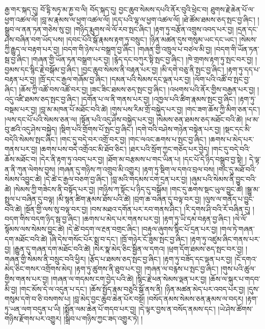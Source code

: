 \setcounter{footnote}{0} 
རྒྱ་གར་སྐད་དུ། བོ་དྷི་སཏྭ་མ་ཎྱ་བ་ལི། བོད་སྐད་དུ། བྱང་ཆུབ་སེམས་དཔའི་ནོར་བུའི་ཕྲེང་བ། ཐུགས་རྗེ་ཆེན་པོ་ལ་ཕྱག་འཚལ་ལོ། །བླ་མ་རྣམས་ལ་ཕྱག་འཚལ་ལོ། །དད་པའི་ལྷ་ལ་ཕྱག་འཚལ་ལོ། །ཐེ་ཚོམ་ཐམས་ཅད་སྤང་བྱ་ཞིང་། །སྒྲུབ་ལ་ནན་ཏན་གཅེས་སུ་བྱ། །གཉིད་རྨུགས་ལེ་ལོ་རབ་སྤང་ཞིང་། །རྟག་ཏུ་བརྩོན་འགྲུས་འབད་པར་བྱ། །དྲན་དང་ཤེས་བཞིན་བག་ཡོད་པས། །དབང་པོའི་སྒོ་རྣམས་རྟག་ཏུ་བསྲུང་། །ཉིན་མཚན་དུས་གསུམ་ཡང་དང་ཡང་། །སེམས་ཀྱི་རྒྱུད་ལ་བརྟག་པར་བྱ། །བདག་གི་ཉེས་པ་བསྒྲག་བྱ་ཞིང་། །གཞན་གྱི་འཁྲུལ་པ་བཙལ་མི་བྱ། །བདག་གི་ཡོན་ཏན་སྦ་བྱ་ཞིང་། །གཞན་གྱི་ཡོན་ཏན་བསྒྲག་པར་བྱ། །རྙེད་དང་བཀུར་སྟི་སྤང་བྱ་ཞིང་། །ཁེ་གྲགས་རྟག་ཏུ་སྤང་བར་བྱ། །བྱམས་དང་སྙིང་རྗེ་བསྒོམ་བྱ་ཞིང་། །བྱང་ཆུབ་སེམས་ནི་བརྟན་པར་བྱ། །མི་དགེ་བཅུ་ནི་སྤང་བྱ་ཞིང་། །རྟག་ཏུ་དད་པ་བརྟན་པར་བྱ། །ཁྲོ་དང་ང་རྒྱལ་གཞོམ་བྱ་ཞིང་། །དམན་པའི་སེམས་དང་ལྡན་པར་བྱ། །ལོག་པའི་འཚོ་བ་སྤང་བྱ་ཞིང་། །ཆོས་ཀྱི་འཚོ་བས་འཚོ་བར་བྱ། །ཟང་ཟིང་ཐམས་ཅད་སྤང་བྱ་ཞིང་། །འཕགས་པའི་ནོར་གྱིས་བརྒྱན་པར་བྱ། །འདུ་འཛི་ཐམས་ཅད་སྤང་བྱ་ཞིང་། །དགོན་པ་ལ་ནི་གནས་པར་བྱ། །འཁྱལ་པའི་ཚིག་རྣམས་སྤང་བྱ་ཞིང་། །རྟག་ཏུ་བསྡམ་པར་བྱ། །བླ་མ་མཁན་པོ་མཐོང་བའི་ཚེ། །གུས་པས་རིམ་གྲོ་བསྐྱེད་པར་བྱ། །གང་ཟག་ཆོས་ཀྱི་མིག་ཅན་དང་། །ལས་དང་པོ་པའི་སེམས་ཅན་ལ། །སྟོན་པའི་འདུ་ཤེས་བསྐྱེད་པར་བྱ། །སེམས་ཅན་ཐམས་ཅད་མཐོང་བའི་ཚེ། །ཕ་མ་བུ་ཚའི་འདུ་ཤེས་བསྐྱེད། །སྡིག་པའི་གྲོགས་པོ་སྤང་བྱ་ཞིང་། །དགེ་བའི་བཤེས་གཉེན་བསྟེན་པར་བྱ། །སྡང་དང་མི་བདེའི་སེམས་སྤང་ཞིང་། །གང་དུ་བདེ་བར་འགྲོ་བར་བྱ། །གང་ལའང་ཆགས་པ་སྤང་བྱ་ཞིང་། །ཆགས་པ་མེད་པར་གནས་པར་བྱ། །ཆགས་པས་བདེ་འགྲོའང་མི་ཐོབ་ཅིང་། །ཐར་པའི་སྲོག་ཀྱང་གཅོད་པར་བྱེད། །གང་དུ་བདེ་བའི་ཆོས་མཐོང་བ། །དེར་ནི་རྟག་ཏུ་འབད་པར་བྱ། །ཐོག་མ་བརྩམས་པ་གང་ཡིན་པ། །དང་པོ་དེ་ཉིད་བསྒྲུབ་བྱ་སྟེ། །
དེ་ལྟ་ན་ནི་ཀུན་ལེགས་བྱས། །གཞན་དུ་གཉིས་ཀ་འགྲུབ་མི་འགྱུར། །རྟག་ཏུ་སྡིག་ལ་དགའ་བྲལ་བས། །གང་དུ་མཐོ་བའི་སེམས་འབྱུང་ཚེ། །དེ་ཚེ་ང་རྒྱལ་བཅག་བྱ་ཞིང་། །བླ་མའི་གདམས་ངག་དྲན་པར་བྱ། །ཞུམ་པའི་སེམས་ནི་བྱུང་བའི་ཚེ། །སེམས་ཀྱི་གཟེངས་ནི་བསྟོད་པར་བྱ། །གཉིས་ཀ་སྟོང་པ་ཉིད་དུ་བསྒོམ། །གང་དུ་ཆགས་སྡང་ཡུལ་བྱུང་ཚེ། །སྒྱུ་མ་སྤྲུལ་པ་བཞིན་དུ་བལྟ། །མི་སྙན་ཚིག་རྣམས་ཐོས་པའི་ཚེ། །བྲག་ཆ་བཞིན་དུ་བལྟ་བར་བྱ། །ལུས་ལ་གནོད་པ་བྱུང་བའི་ཚེ། །སྔོན་གྱི་ལས་སུ་བལྟ་བར་བྱ། །བས་མཐའ་དགོན་པར་རབ་གནས་ཤིང་། །རི་དྭགས་ཤི་བའི་རོ་བཞིན་དུ། །བདག་གིས་བདག་ཉིད་སྦ་བྱ་ཞིང་། །ཆགས་པ་མེད་པར་གནས་པར་བྱ། །རྟག་ཏུ་ཡི་དམ་བརྟན་བྱ་ཞིང་། །ལེ་ལོ་སྙོམས་ལས་སེམས་བྱུང་ཚེ། །དེ་ཚེ་བདག་ལ་རྔན་བགྲང་ཞིང་། །བརྟུལ་ཞུགས་སྙིང་པོ་དྲན་པར་བྱ། །གལ་ཏེ་གཞན་དག་མཐོང་བའི་ཚེ། །ཞི་དེས་གསོང་པོར་སྨྲ་བ་དང་། །ཁྲོ་གཉེར་ངོ་ཟུམ་སྤང་བྱ་ཞིང་། །རྟག་ཏུ་འཛུམ་ཞིང་གནས་པར་བྱ། །རྒྱུན་དུ་གཞན་དག་མཐོང་བའི་ཚེ། །སེར་སྣ་མེད་ཅིང་སྦྱིན་ལ་དགའ། །ཕྲག་དོག་ཐམས་ཅད་སྤང་བར་བྱ། །གཞན་གྱི་སེམས་ནི་བསྲུང་བའི་ཕྱིར། །རྩོད་པ་ཐམས་ཅད་སྤང་བྱ་ཞིང་། །རྟག་ཏུ་བཟོད་དང་ལྡན་པར་བྱ། །ངོ་དགའ་མེད་ཅིང་གསར་འགྲོགས་མེད། །རྟག་ཏུ་ཚུགས་ནི་ཐུབ་པར་བྱ། །གཞན་ལ་བརྙས་པ་སྤང་བྱ་ཞིང་། །གུས་པའི་ཚུལ་གྱིས་གནས་པར་བྱ། །གཞན་ལ་གདམས་ངག་བྱེད་པའི་ཚེ། །སྙིང་རྗེ་ཕན་སེམས་ལྡན་པར་བྱ། །ཆོས་ལ་སྐུར་པ་གདབ་མི་བྱ། །གང་མོས་དེ་ལ་འདུན་པ་དང་། །ཆོས་སྤྱོད་རྣམ་བཅུའི་སྒོ་ནས་ནི། །ཉིན་མཚན་མེད་པར་འབད་པར་བྱ། །དུས་གསུམ་དགེ་བ་ཅི་བསགས་པ། །བླ་མེད་བྱང་ཆུབ་ཆེན་པོར་བསྔོ། །བསོད་ནམས་སེམས་ཅན་རྣམས་ལ་བདར། །རྟག་ཏུ་ཡན་ལག་བདུན་པ་ཡི། །སྨོན་ལམ་ཆེན་པོ་གདབ་པར་བྱ། །དེ་ལྟར་བྱས་ན་བསོད་ནམས་དང་། །ཡེ་ཤེས་ཚོགས་གཉིས་རྫོགས་པར་འགྱུར། །སྒྲིབ་པ་གཉིས་ཀྱང་ཟད་འགྱུར་ཏེ། །
